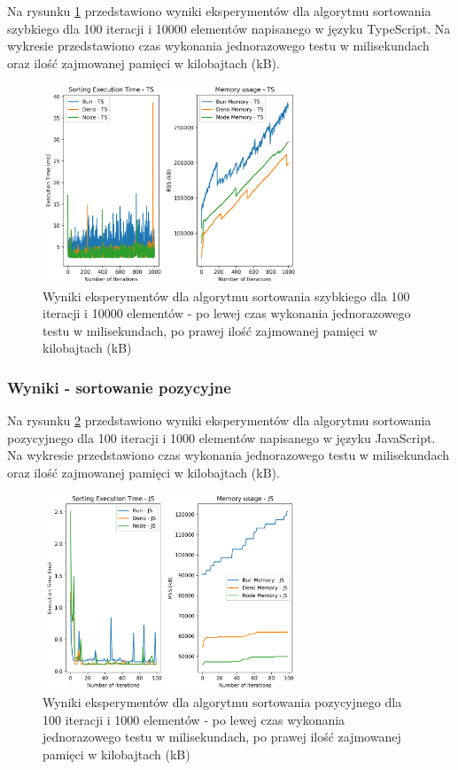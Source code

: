 Na rysunku \ref{fig:quick_sorting_e4_ts} przedstawiono wyniki eksperymentów dla algorytmu sortowania szybkiego dla 100 iteracji i 10000 elementów napisanego w języku TypeScript. Na wykresie przedstawiono czas wykonania jednorazowego testu w milisekundach oraz ilość zajmowanej pamięci w kilobajtach (kB).

\begin{figure}[H]
  \centering
  \includegraphics[width=0.68\textwidth]{Figures/sorting/sorting_quick_1000_10000_ts.png}
  \caption{Wyniki eksperymentów dla algorytmu sortowania szybkiego dla 100 iteracji i 10000 elementów - po lewej czas wykonania jednorazowego testu w milisekundach, po prawej ilość zajmowanej pamięci w kilobajtach (kB)}
  \label{fig:quick_sorting_e4_ts}
\end{figure}

\subsubsection{Wyniki - sortowanie pozycyjne}
Na rysunku \ref{fig:radix_sorting_e1} przedstawiono wyniki eksperymentów dla algorytmu sortowania pozycyjnego dla 100 iteracji i 1000 elementów napisanego w języku JavaScript. Na wykresie przedstawiono czas wykonania jednorazowego testu w milisekundach oraz ilość zajmowanej pamięci w kilobajtach (kB).

\begin{figure}[H]
  \centering
  \includegraphics[width=0.68\textwidth]{Figures/sorting/sorting_radix_100_1000_js.png}
  \caption{Wyniki eksperymentów dla algorytmu sortowania pozycyjnego dla 100 iteracji i 1000 elementów - po lewej czas wykonania jednorazowego testu w milisekundach, po prawej ilość zajmowanej pamięci w kilobajtach (kB)}
  \label{fig:radix_sorting_e1}
\end{figure}

